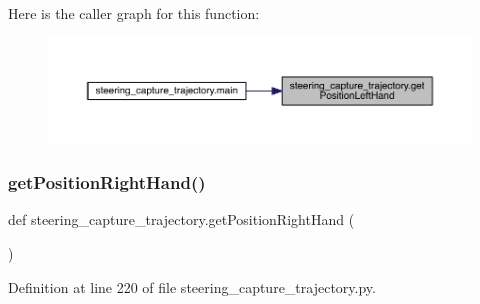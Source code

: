 Here is the caller graph for this function\+:\nopagebreak
\begin{figure}[H]
\begin{center}
\leavevmode
\includegraphics[width=350pt]{namespacesteering__capture__trajectory_a0997cf216eac9c4faad98f7ec77d90b2_icgraph}
\end{center}
\end{figure}
\mbox{\label{namespacesteering__capture__trajectory_aef42b4c4dfb5a6a191011fd3ba71f79d}} 
\subsubsection{\texorpdfstring{getPositionRightHand()}{getPositionRightHand()}}
{\footnotesize\ttfamily def steering\+\_\+capture\+\_\+trajectory.\+get\+Position\+Right\+Hand (\begin{DoxyParamCaption}{ }\end{DoxyParamCaption})}



Definition at line 220 of file steering\+\_\+capture\+\_\+trajectory.\+py.


